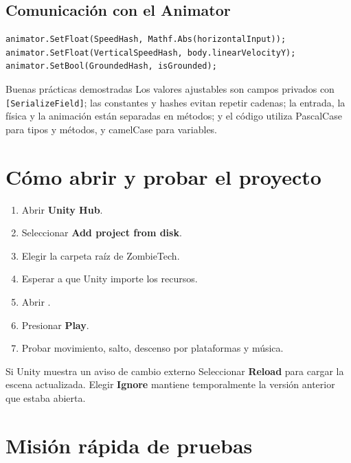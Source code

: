\documentclass[11pt,a4paper]{article}
\begin{document}
\subsection{Comunicación con el Animator}

\begin{lstlisting}[style=codestyle]
animator.SetFloat(SpeedHash, Mathf.Abs(horizontalInput));
animator.SetFloat(VerticalSpeedHash, body.linearVelocityY);
animator.SetBool(GroundedHash, isGrounded);
\end{lstlisting}

\begin{gamebox}{Buenas prácticas demostradas}
Los valores ajustables son campos privados con \texttt{[SerializeField]}; las constantes y hashes evitan repetir cadenas; la entrada, la física y la animación están separadas en métodos; y el código utiliza PascalCase para tipos y métodos, y camelCase para variables.
\end{gamebox}

\section{Cómo abrir y probar el proyecto}

\begin{enumerate}
  \item Abrir \textbf{Unity Hub}.
  \item Seleccionar \textbf{Add project from disk}.
  \item Elegir la carpeta raíz de ZombieTech.
  \item Esperar a que Unity importe los recursos.
  \item Abrir .
  \item Presionar \textbf{Play}.
  \item Probar movimiento, salto, descenso por plataformas y música.
\end{enumerate}

\begin{warningbox}{Si Unity muestra un aviso de cambio externo}
Seleccionar \textbf{Reload} para cargar la escena actualizada. Elegir \textbf{Ignore} mantiene temporalmente la versión anterior que estaba abierta.
\end{warningbox}

\section{Misión rápida de pruebas}
\end{document}
